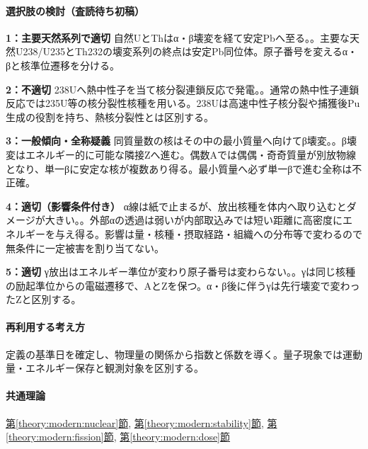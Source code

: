 \paragraph{選択肢の検討（査読待ち初稿）}\mbox{}\par

\noindent\textbf{1：主要天然系列で適切} 自然UとThはα・β壊変を経て安定Pbへ至る。。主要な天然U238/U235とTh232の壊変系列の終点は安定Pb同位体。原子番号を変えるα・βと核準位遷移を分ける。\par

\noindent\textbf{2：不適切} 238Uへ熱中性子を当て核分裂連鎖反応で発電。。通常の熱中性子連鎖反応では235U等の核分裂性核種を用いる。238Uは高速中性子核分裂や捕獲後Pu生成の役割を持ち、熱核分裂性とは区別する。\par

\noindent\textbf{3：一般傾向・全称疑義} 同質量数の核はその中の最小質量へ向けてβ壊変。。β壊変はエネルギー的に可能な隣接Zへ進む。偶数Aでは偶偶・奇奇質量が別放物線となり、単一βに安定な核が複数あり得る。最小質量へ必ず単一βで進む全称は不正確。\par

\noindent\textbf{4：適切（影響条件付き）} α線は紙で止まるが、放出核種を体内へ取り込むとダメージが大きい。。外部αの透過は弱いが内部取込みでは短い距離に高密度にエネルギーを与え得る。影響は量・核種・摂取経路・組織への分布等で変わるので無条件に一定被害を割り当てない。\par

\noindent\textbf{5：適切} γ放出はエネルギー準位が変わり原子番号は変わらない。。γは同じ核種の励起準位からの電磁遷移で、AとZを保つ。α・β後に伴うγは先行壊変で変わったZと区別する。\par

\paragraph{再利用する考え方} 定義の基準日を確定し、物理量の関係から指数と係数を導く。量子現象では運動量・エネルギー保存と観測対象を区別する。

\paragraph{共通理論} \hyperref[theory:modern:nuclear]{第\ref*{theory:modern:nuclear}節}, \hyperref[theory:modern:stability]{第\ref*{theory:modern:stability}節}, \hyperref[theory:modern:fission]{第\ref*{theory:modern:fission}節}, \hyperref[theory:modern:dose]{第\ref*{theory:modern:dose}節}

